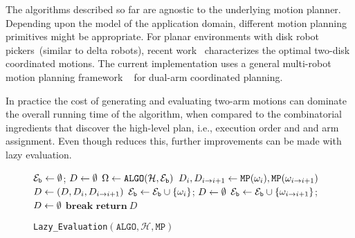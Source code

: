 The algorithms described so far are agnostic to the underlying motion planner.
Depending upon the model of the application domain, different motion planning primitives might be appropriate. For planar environments with disk robot pickers~(similar to delta robots), recent work~\cite{kirkpatrick2016characterizing} characterizes the optimal two-disk coordinated motions. The current implementation uses a general multi-robot motion planning framework \drrtstar~\cite{Dobson:2017aa} for dual-arm coordinated planning.


In practice the cost of generating and evaluating two-arm motions can dominate the overall running time of the algorithm, when compared to the combinatorial ingredients that discover the high-level plan, i.e., execution order and and arm assignment. Even though \algo reduces this, further improvements can be made with lazy evaluation. 

\begin{wrapfigure}{r}{0.6\textwidth}
  \vspace{-0.1in}
  \begin{minipage}{0.6\textwidth}
  \vspace{0pt} 
  \begin{algorithm}[H]
  \caption{{\tt Lazy\_Evaluation}$ (\mathtt{ALGO}, \mathcal{H}, \mathtt{MP}) $}
  \label{algo:lazy}
  $ \mathcal{E}_{\mathtt{b}}\leftarrow\emptyset $;  $ D \leftarrow \emptyset $\;
  {
      $ {{\Omega}}\leftarrow \mathtt{ALGO} ( \mathcal{H},   \mathcal{E}_{\mathtt{b}}  ) $\;
      {
          $ D_i,D_{i\rightarrow i+1} \leftarrow \mathtt{MP}({\omega}_i), \mathtt{MP}( {\omega}_{i\rightarrow{i+1}} ) $\;
          $ D\leftarrow (D,D_i,D_{i\rightarrow i+1} ) $\;
          {
              $ \mathcal{E}_{\mathtt{b}} \leftarrow \mathcal{E}_{\mathtt{b}}\cup \{{\omega}_i\}$; $ D \leftarrow \emptyset$\;
          }
          {
              $ \mathcal{E}_{\mathtt{b}} \leftarrow \mathcal{E}_{\mathtt{b}}\cup \{{\omega}_{i\rightarrow{i+1}}\}$; $D \leftarrow \emptyset $\;
          }
          \lIf{$ \D=\emptyset $}
          {
          $\mathbf{break}$
          }
      }
  }
  $\mathbf{return}\ D$
  \end{algorithm}
  \end{minipage}
  \vspace{-0.35in}
\end{wrapfigure}

